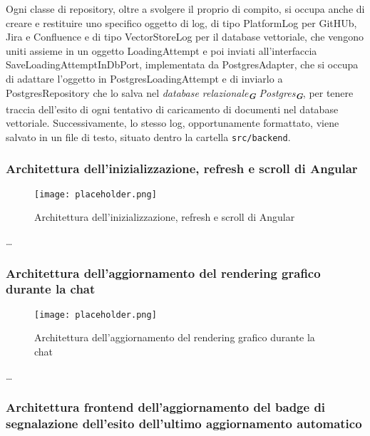 Ogni classe di repository, oltre a svolgere il proprio di compito, si occupa anche di creare e restituire uno specifico oggetto di log, di tipo PlatformLog per GitHUb, Jira e Confluence e di tipo VectorStoreLog per il database vettoriale, che vengono uniti assieme in un oggetto LoadingAttempt e poi inviati all'interfaccia SaveLoadingAttemptInDbPort, implementata da PostgresAdapter, che si occupa di adattare l'oggetto in PostgresLoadingAttempt e di inviarlo a PostgresRepository che lo salva nel \emph{database relazionale}\textsubscript{\textbf{\textit{G}}} \emph{Postgres}\textsubscript{\textbf{\textit{G}}}, per tenere traccia dell'esito di ogni tentativo di caricamento di documenti nel database vettoriale. Successivamente, lo stesso log, opportunamente formattato, viene salvato in un file di testo, situato dentro la cartella \texttt{src/backend}.

\newpage


\subsubsection{Architettura dell’inizializzazione, refresh e scroll di Angular}
\label{sec:architettura_inizializzazione_angular}

\begin{figure}[h]
    \centering
    \texttt{[image: placeholder.png]}
    \caption{Architettura dell’inizializzazione, refresh e scroll di Angular}
\end{figure}

\dots

\newpage


\subsubsection{Architettura dell’aggiornamento del rendering grafico durante la chat}
\label{sec:architettura_aggiornamento_rendering_chat}

\begin{figure}[h]
    \centering
    \texttt{[image: placeholder.png]}
    \caption{Architettura dell’aggiornamento del rendering grafico durante la chat}
\end{figure}

\dots

\newpage


\subsubsection{Architettura frontend dell’aggiornamento del badge di segnalazione dell’esito dell’ultimo aggiornamento automatico}
\label{sec:architettura_frontend_badge_aggiornamento}

